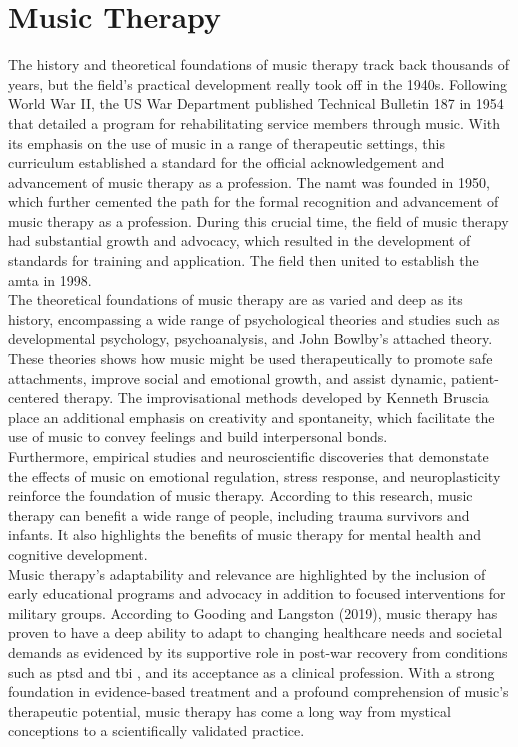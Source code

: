 \section{Music Therapy}
The history and theoretical foundations of music therapy track back thousands of years, but the field's practical development really took off in the 1940s.
Following World War II, the US War Department published Technical Bulletin 187 in 1954 that detailed a program for rehabilitating service members through music. \citep{else_2014_music}
With its emphasis on the use of music in a range of therapeutic settings, this curriculum established a standard for the official acknowledgement and advancement of music therapy as a profession.
The \gls{namt} was founded in 1950, which further cemented the path for the formal recognition and advancement of music therapy as a profession. \citep{else_2014_music}
During this crucial time, the field of music therapy had substantial growth and advocacy, which resulted in the development of standards for training and application. 
The field then united to establish the \gls{amta} in 1998. \citep{else_2014_music}
\\
\indent The theoretical foundations of music therapy are as varied and deep as its history, encompassing a wide range of psychological theories and studies such as developmental psychology, psychoanalysis, and John Bowlby's attached theory. \citep{ackerman_2018_what}
These theories shows how music might be used therapeutically to promote safe attachments, improve social and emotional growth, and assist dynamic, patient-centered therapy. 
The improvisational methods developed by Kenneth Bruscia place an additional emphasis on creativity and spontaneity, which facilitate the use of music to convey feelings and build interpersonal bonds.\citep{bruscia_1987_improvisational}
\\
\indent Furthermore, empirical studies and neuroscientific discoveries that demonstate the effects of music on emotional regulation, stress response, and neuroplasticity reinforce the foundation of music therapy. \citep{hillecke_2005_scientific}
According to this research, music therapy can benefit a wide range of people, including trauma survivors and infants. It also highlights the benefits of music therapy for mental health and cognitive development.
\\
\indent Music therapy's adaptability and relevance are highlighted by the inclusion of early educational programs and advocacy in addition to focused interventions for military groups. \citep{else_2014_music}
According to Gooding and Langston (2019), music therapy has proven to have a deep ability to adapt to changing healthcare needs and societal demands as evidenced by its supportive role in post-war recovery from conditions such as \gls{ptsd} and \gls{tbi} \nocite{gooding_2019_music}, and its acceptance as a clinical profession. \citep{garrison_2021_music}
With a strong foundation in evidence-based treatment and a profound comprehension of music's therapeutic potential, music therapy has come a long way from mystical conceptions to a scientifically validated practice.

